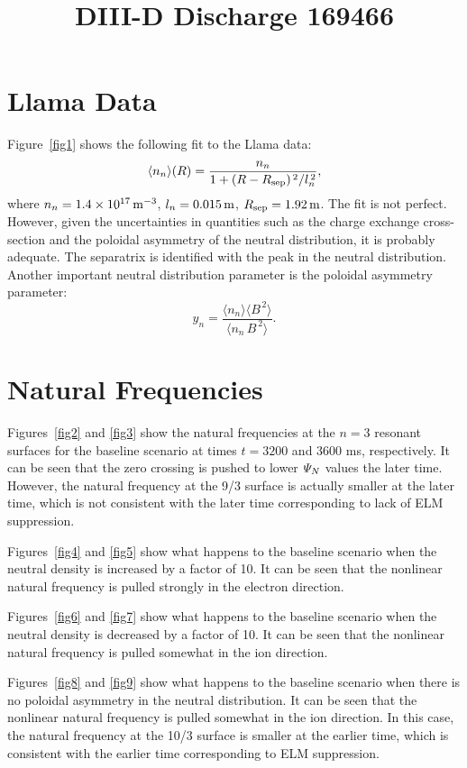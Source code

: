 \documentclass[12pt]{article}
\title{\bf DIII-D Discharge 169466}
\date{}
\author{}
\begin{document}
\maketitle

\section{Llama Data}
Figure~\ref{fig1} shows the following fit to the Llama data:
\begin{equation}
\langle n_n\rangle(R) = \frac{n_n}{1+(R-R_{\rm sep})^{\,2}/l_n^{\,2}},
\end{equation}
where $n_n = 1.4\times 10^{17}\,{\rm m}^{-3}$, $l_n= 0.015\,{\rm m}$, $R_{\rm sep}= 1.92\,{\rm m}$.  The fit is not perfect. However, given
the uncertainties in quantities such as the charge exchange cross-section and the poloidal asymmetry of the neutral distribution, it is probably adequate. The separatrix is identified with the peak in the neutral distribution. Another important neutral
distribution parameter is the poloidal asymmetry parameter:
\begin{equation}
y_n = \frac{\langle n_n\rangle\langle B^{\,2}\rangle}{\langle n_n\,B^{\,2}\rangle}.
\end{equation}

\section{Natural Frequencies}
Figures~\ref{fig2} and \ref{fig3} show the natural frequencies at the $n=3$ resonant surfaces for the baseline scenario
at times $t=3200$ and 3600 ms, respectively. It can be seen that the zero crossing is pushed to lower ${\mit\Psi}_N$ values the later time. 
However, the natural frequency at the 9/3 surface is actually smaller at the later time, which is not consistent with the later time
corresponding to lack of ELM suppression.

Figures~\ref{fig4} and \ref{fig5} show what happens to the baseline scenario when the neutral density is increased by a factor of
10. It can be seen that the nonlinear natural frequency is pulled strongly in the electron direction.

Figures~\ref{fig6} and \ref{fig7} show what happens to the baseline scenario when the neutral density is decreased by a factor of
10. It can be seen that the nonlinear natural frequency is pulled somewhat in the ion direction.

Figures~\ref{fig8} and \ref{fig9} show what happens to the baseline scenario when there is no poloidal asymmetry in the neutral distribution. It can be seen that the nonlinear natural frequency is pulled somewhat in the ion direction. In this case, the natural frequency at the 10/3 surface is smaller at the earlier time, which is consistent with the earlier time
corresponding to  ELM suppression.
\end{document}
